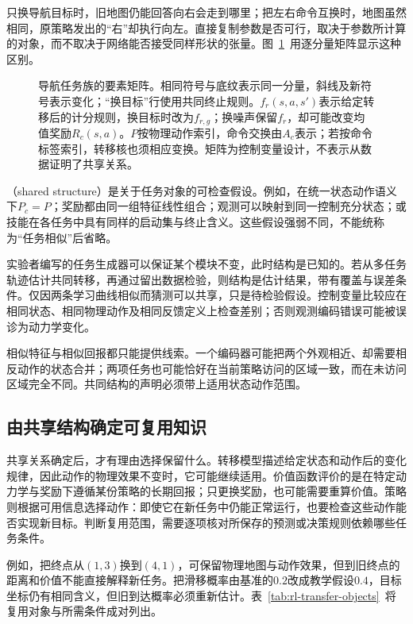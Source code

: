 只换导航目标时，旧地图仍能回答向右会走到哪里；把左右命令互换时，地图虽然相同，原策略发出的“右”却执行向左。直接复制参数是否可行，取决于参数所计算的对象，而不取决于网络能否接受同样形状的张量。图~\ref{fig:rl-transfer-components}~用逐分量矩阵显示这种区别。

\begin{figure}[htbp]
  \centering
  
  \caption{导航任务族的要素矩阵。相同符号与底纹表示同一分量，斜线及新符号表示变化；“换目标”行使用共同终止规则。$f_r(s,a,s')$表示给定转移后的计分规则，换目标时改为$f_{r,g}$；换噪声保留$f_r$，却可能改变均值奖励$R_c(s,a)$。$P$按物理动作索引，命令交换由$A_c$表示；若按命令标签索引，转移核也须相应变换。矩阵为控制变量设计，不表示从数据证明了共享关系。}
  \label{fig:rl-transfer-components}
\end{figure}

（shared structure）是关于任务对象的可检查假设。例如，在统一状态动作语义下$P_c=P$；奖励都由同一组特征线性组合；观测可以映射到同一控制充分状态；或技能在各任务中具有同样的启动集与终止含义。这些假设强弱不同，不能统称为“任务相似”后省略。

实验者编写的任务生成器可以保证某个模块不变，此时结构是已知的。若从多任务轨迹估计共同转移，再通过留出数据检验，则结构是估计结果，带有覆盖与误差条件。仅因两条学习曲线相似而猜测可以共享，只是待检验假设。控制变量比较应在相同状态、相同物理动作及相同反馈定义上检查差别；否则观测编码错误可能被误诊为动力学变化。

相似特征与相似回报都只能提供线索。一个编码器可能把两个外观相近、却需要相反动作的状态合并；两项任务也可能恰好在当前策略访问的区域一致，而在未访问区域完全不同。共同结构的声明必须带上适用状态动作范围。

\subsection{由共享结构确定可复用知识}
\label{sec:rl-transfer-objects}

共享关系确定后，才有理由选择保留什么。转移模型描述给定状态和动作后的变化规律，因此动作的物理效果不变时，它可能继续适用。价值函数评价的是在特定动力学与奖励下遵循某份策略的长期回报；只更换奖励，也可能需要重算价值。策略则根据可用信息选择动作：即使它在新任务中仍能正常运行，也要检查这些动作能否实现新目标。判断复用范围，需要逐项核对所保存的预测或决策规则依赖哪些任务条件。

例如，把终点从$(1,3)$换到$(4,1)$，可保留物理地图与动作效果，但到旧终点的距离和价值不能直接解释新任务。把滑移概率由基准的$0.2$改成教学假设$0.4$，目标坐标仍有相同含义，但旧到达概率必须重新估计。表~\ref{tab:rl-transfer-objects}~将复用对象与所需条件成对列出。

